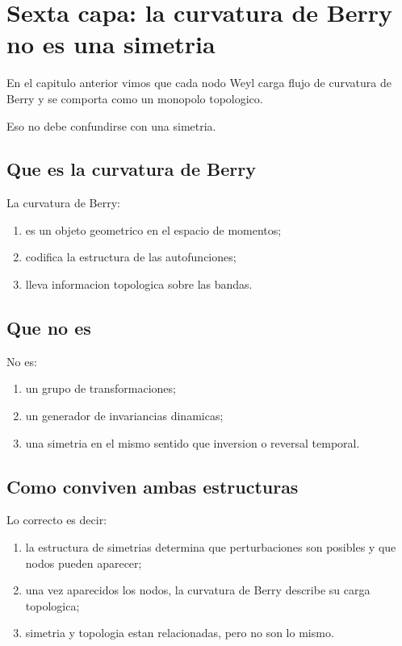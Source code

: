 \section{Sexta capa: la curvatura de Berry no es una simetria}
En el capitulo anterior vimos que cada nodo Weyl carga flujo de curvatura de Berry y se comporta como un monopolo topologico.

Eso no debe confundirse con una simetria.

\subsection{Que es la curvatura de Berry}
La curvatura de Berry:
\begin{enumerate}[label=\arabic*.]
    \item es un objeto geometrico en el espacio de momentos;
    \item codifica la estructura de las autofunciones;
    \item lleva informacion topologica sobre las bandas.
\end{enumerate}

\subsection{Que no es}
No es:
\begin{enumerate}[label=\arabic*.]
    \item un grupo de transformaciones;
    \item un generador de invariancias dinamicas;
    \item una simetria en el mismo sentido que inversion o reversal temporal.
\end{enumerate}

\subsection{Como conviven ambas estructuras}
Lo correcto es decir:
\begin{enumerate}[label=\arabic*.]
    \item la estructura de simetrias determina que perturbaciones son posibles y que nodos pueden aparecer;
    \item una vez aparecidos los nodos, la curvatura de Berry describe su carga topologica;
    \item simetria y topologia estan relacionadas, pero no son lo mismo.
\end{enumerate}


